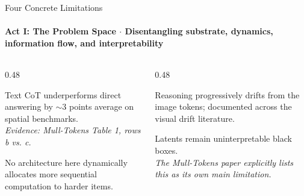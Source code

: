 \documentclass[aspectratio=169, 10pt]{beamer}
\begin{document}
\begin{frame}{Four Concrete Limitations}
  \framesubtitle{Act I: The Problem Space $\cdot$ Disentangling substrate, dynamics, information flow, and interpretability}
  
  \begin{columns}[T]
    \begin{column}{0.48\textwidth}
      \begin{tcolorbox}[metriccard, title=\textbf{1. Verbalisation Loses Spatial Structure}]
        \small
        Text CoT underperforms direct answering by \alert{$\sim 3$ points} average on spatial benchmarks.\\
        \textit{\scriptsize Evidence: Mull-Tokens Table 1, rows b vs. c.}
      \end{tcolorbox}
      \vspace{4pt}
      \begin{tcolorbox}[metriccard, title=\textbf{2. Fixed Compute Budget}]
        \small
        No architecture here dynamically allocates more sequential computation to harder items.
      \end{tcolorbox}
    \end{column}
    
    \begin{column}{0.48\textwidth}
      \begin{tcolorbox}[metriccard, title=\textbf{3. Visual Grounding Decays with Depth}]
        \small
        Reasoning progressively drifts from the image tokens; documented across the visual drift literature.
      \end{tcolorbox}
      \vspace{4pt}
      \begin{tcolorbox}[alertcard, title=\textbf{4. Latents are Uninterpretable}]
        \small
        Latents remain uninterpretable black boxes.\\
        \textit{\scriptsize The Mull-Tokens paper explicitly lists this as its own main limitation.}
      \end{tcolorbox}
    \end{column}
  \end{columns}

\end{frame}
\end{document}
